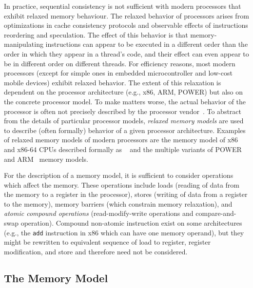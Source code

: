 In practice, sequential consistency is not sufficient with modern processors
that exhibit relaxed memory behaviour.
The relaxed behavior of processors arises from optimizations in cache
consistency protocols and observable effects of instructions reordering and
speculation.
The effect of this behavior is that memory-manipulating instructions can appear
to be executed in a different order than the order in which they appear in a
thread's code, and their effect can even appear to be in different order on
different threads.
For efficiency reasons, most modern processors (except for simple ones in
embedded microcontroller and low-cost mobile devices) exhibit relaxed behavior.
The extent of this relaxation is dependent on the processor architecture (e.g.,
x86, ARM, POWER) but also on the concrete processor model.
To make matters worse, the actual behavior of the processor is often not
precisely described by the processor vendor~.
To abstract from the details of particular processor models, \emph{relaxed
memory models} are used to describe (often formally) behavior of a given
processor architecture.
Examples of relaxed memory models of modern processors are the memory model of
x86 and x86-64 CPUs described formally as \xtso~ and the multiple
variants of POWER~ and
ARM~ memory models.

For the description of a memory model, it is sufficient to consider operations
which affect the memory.
These operations include loads (reading of data from the memory to a register
in the processor), stores (writing of data from a register to the memory),
memory barriers (which constrain memory relaxation), and \emph{atomic compound
operations} (read-modify-write operations and compare-and-swap operation).
Compound non-atomic instruction exist on some architectures (e.g., the
\texttt{add} instruction in x86 which can have one memory operand), but they
might be rewritten to equivalent sequence of load to register, register
modification, and store and therefore need not be considered.

\subsection{The \xtso Memory Model}\label{chap:prelim:xtso}


